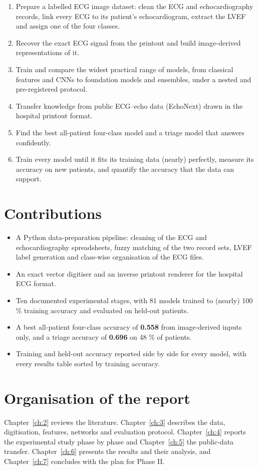 \begin{enumerate}
  \item Prepare a labelled ECG image dataset: clean the ECG and echocardiography records, link every ECG to its patient's echocardiogram, extract the LVEF and assign one of the four classes.
  \item Recover the exact ECG signal from the printout and build image-derived representations of it.
  \item Train and compare the widest practical range of models, from classical features and CNNs to foundation models and ensembles, under a nested and pre-registered protocol.
  \item Transfer knowledge from public ECG--echo data (EchoNext) drawn in the hospital printout format.
  \item Find the best all-patient four-class model and a triage model that answers confidently.
  \item Train every model until it fits its training data (nearly) perfectly, measure its accuracy on new patients, and quantify the accuracy that the data can support.
\end{enumerate}
\section{Contributions}\label{sec:1.4}

\begin{itemize}
  \item A Python data-preparation pipeline: cleaning of the ECG and echocardiography spreadsheets, fuzzy matching of the two record sets, LVEF label generation and class-wise organisation of the ECG files.
  \item An exact vector digitiser and an inverse printout renderer for the hospital ECG format.
  \item Ten documented experimental stages, with 81 models trained to (nearly) 100 \% training accuracy and evaluated on held-out patients.
  \item A best all-patient four-class accuracy of \textbf{0.558} from image-derived inputs only, and a triage accuracy of \textbf{0.696} on 48 \% of patients.
  \item Training and held-out accuracy reported side by side for every model, with every results table sorted by training accuracy.
\end{itemize}
\section{Organisation of the report}\label{sec:1.5}

Chapter~\ref{ch:2} reviews the literature. Chapter~\ref{ch:3} describes the data, digitisation, features, networks and evaluation protocol. Chapter~\ref{ch:4} reports the experimental study phase by phase and Chapter~\ref{ch:5} the public-data transfer. Chapter~\ref{ch:6} presents the results and their analysis, and Chapter~\ref{ch:7} concludes with the plan for Phase II.

